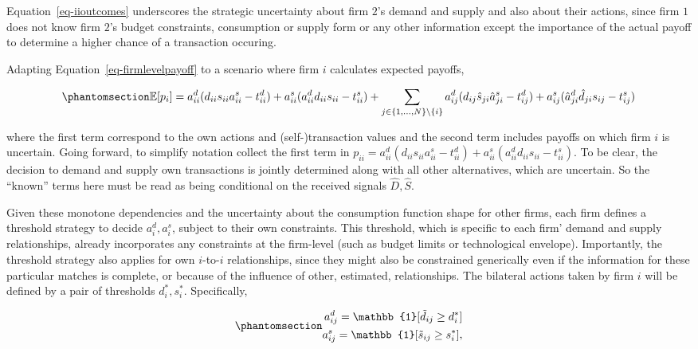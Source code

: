 \documentclass[
]{article}
\theoremstyle{definition}
\theoremstyle{plain}
\theoremstyle{remark}
\begin{document}
Equation~\ref{eq-iioutcomes} underscores the strategic uncertainty about
firm \(2\)'s demand and supply and also about their actions, since firm
\(1\) does not know firm \(2\)'s budget constraints, consumption or
supply form or any other information except the importance of the actual
payoff to determine a higher chance of a transaction occuring.

Adapting Equation~\ref{eq-firmlevelpayoff} to a scenario where firm
\(i\) calculates expected payoffs,

\begin{equation}\phantomsection\label{eq-iifirmlevelpayoff}{
\mathbb{E}[p_i] = a_{ii}^d (d_{ii} s_{ii} a_{ii}^s - t_{ii}^d) + a_{ii}^s (a_{ii}^d d_{ii} s_{ii} - t_{ii}^s) + \sum_{j \in \{1, \dots, N\}\setminus \{i\}} a_{ij}^d (d_{ij} \hat{s}_{ji} \hat{a}_{ji}^s - t_{ij}^d) + a_{ij}^s (\hat{a}_{ji}^d \hat{d}_{ji} s_{ij} - t_{ij}^s)
}\end{equation}

where the first term correspond to the own actions and
(self-)transaction values and the second term includes payoffs on which
firm \(i\) is uncertain. Going forward, to simplify notation collect the
first term in
\(p_{ii} = a_{ii}^d (d_{ii} s_{ii} a_{ii}^s - t_{ii}^d) + a_{ii}^s (a_{ii}^d d_{ii} s_{ii} - t_{ii}^s)\).
To be clear, the decision to demand and supply own transactions is
jointly determined along with all other alternatives, which are
uncertain. So the ``known'' terms here must be read as being conditional
on the received signals \(\hat{D}, \hat{S}\).

Given these monotone dependencies and the uncertainty about the
consumption function shape for other firms, each firm defines a
threshold strategy to decide \(a_{i}^d, a_{i}^s\), subject to their own
constraints. This threshold, which is specific to each firm' demand and
supply relationships, already incorporates any constraints at the
firm-level (such as budget limits or technological envelope).
Importantly, the threshold strategy also applies for own \(i\)-to-\(i\)
relationships, since they might also be constrained generically even if
the information for these particular matches is complete, or because of
the influence of other, estimated, relationships. The bilateral actions
taken by firm \(i\) will be defined by a pair of thresholds
\(d_{i}^*, s_{i}^*\). Specifically,

\begin{equation}\phantomsection\label{eq-thresholds}{
\begin{split}
a_{ij}^d = \mathbb{1}[\tilde{d}_{ij} \geq d_{i}^*] \\
a_{ij}^s = \mathbb{1}[\tilde{s}_{ij} \geq s_{i}^*],
\end{split}
}\end{equation}
\end{document}
